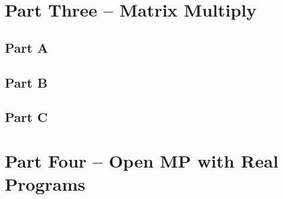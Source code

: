 \documentclass[12pt,8.5in,11in]{article}
\begin{document}
\section{Part Three -- Matrix Multiply}

	\subsection{Part A}
	
	\subsection{Part B}
	
	\subsection{Part C}
	
\section{Part Four -- Open MP with Real Programs}	
	
\end{document}
